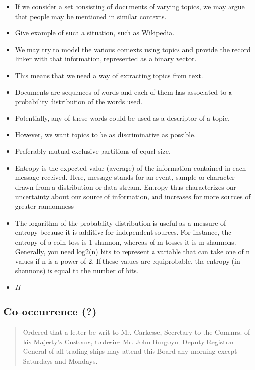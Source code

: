 \begin{itemize}
    \item If we consider a set consisting of documents of varying topics, we may argue that people may be mentioned in similar contexts.
    \item Give example of such a situation, such as Wikipedia.
    \item We may try to model the various contexts using topics and provide the record linker with that information, represented as a binary vector.
    \item This means that we need a way of extracting topics from text.
    \item Documents are sequences of words and each of them has associated to a probability distribution of the words used.
    \item Potentially, any of these words could be used as a descriptor of a topic.
    \item However, we want topics to be as discriminative as possible.
    \item Preferably mutual exclusive partitions of equal size.
    \item Entropy is the expected value (average) of the information contained in each message received. Here, message stands for an event, sample or character drawn from a distribution or data stream. Entropy thus characterizes our uncertainty about our source of information, and increases for more sources of greater randomness
    \item The logarithm of the probability distribution is useful as a measure of entropy because it is additive for independent sources. For instance, the entropy of a coin toss is 1 shannon, whereas of m tosses it is m shannons. Generally, you need log2(n) bits to represent a variable that can take one of n values if n is a power of 2. If these values are equiprobable, the entropy (in shannons) is equal to the number of bits.
    \item $H$
\end{itemize}




\subsection{Co-occurrence (?)}
\label{sec:co-occurrence}

\begin{quote}
    Ordered that a letter be writ to Mr. Carkesse, Secretary to the Commrs. of his Majesty's Customs, to desire Mr. John Burgoyn, Deputy Registrar General of all trading ships may attend this Board any morning except Saturdays and Mondays.
\end{quote}

